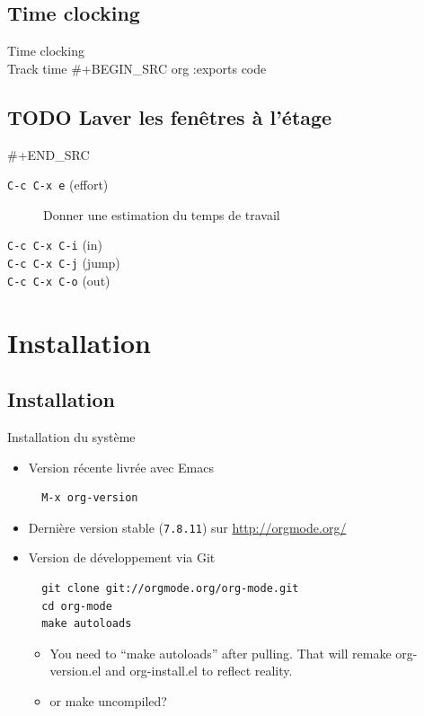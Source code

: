 \documentclass[presentation,t,hideothersubsections]{beamer}
\begin{document}
\subsection{Time clocking}
\label{sec-5-8}

\begin{frame}[label=sec-5-8-1]{Time clocking \\ Track time}
\#+BEGIN\_SRC org :exports code
\end{frame}

\subsection{{\color{red}\textbf{\textsc{\textsf{TODO}}}} Laver les fenêtres à l'étage}
\label{sec-5-9}
\#+END\_SRC

\begin{description}
\item[\texttt{C-c C-x e} (effort)] Donner une estimation du temps de travail
\item[\texttt{C-c C-x C-i} (in)]
\item[\texttt{C-c C-x C-j} (jump)]
\item[\texttt{C-c C-x C-o} (out)]
\end{description}
\section{Installation}
\label{sec-6}

\subsection{Installation}
\label{sec-6-1}

\begin{frame}[fragile,label=sec-6-1-1]{Installation du système}
 \begin{itemize}
\item Version récente livrée avec \alert{Emacs}

\lstset{language=Lisp,numbers=none}
\begin{lstlisting}
  M-x org-version
\end{lstlisting}

\item Dernière version stable (\verb~7.8.11~) sur \url{http://orgmode.org/}

\item Version de développement via Git

\lstset{language=sh,numbers=none}
\begin{lstlisting}
  git clone git://orgmode.org/org-mode.git
  cd org-mode
  make autoloads
\end{lstlisting}

\begin{itemize}
\item You need to ``make autoloads'' after pulling. That will remake
org-version.el and org-install.el to reflect reality.

\item or make uncompiled?
\end{itemize}
\end{itemize}
\end{frame}
\end{document}
